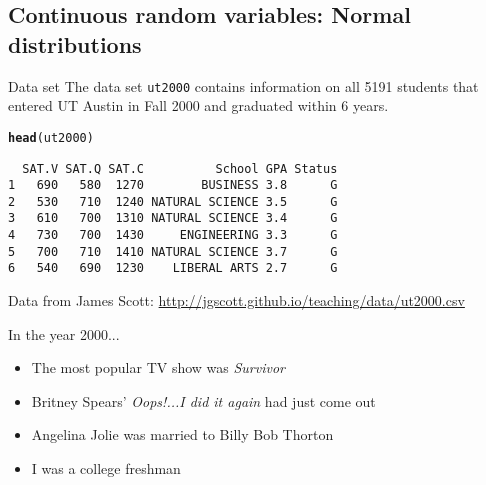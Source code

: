\documentclass{beamer}\usepackage[]{graphicx}\usepackage[]{color}
\makeatletter
\def\maxwidth{ %
  \ifdim\Gin@nat@width>\linewidth
    \linewidth
  \else
    \Gin@nat@width
  \fi
}
\newcommand{\hlstr}[1]{\textcolor[rgb]{0.192,0.494,0.8}{#1}}%
\newcommand{\hlopt}[1]{\textcolor[rgb]{0,0,0}{#1}}%
\newcommand{\hlstd}[1]{\textcolor[rgb]{0.345,0.345,0.345}{#1}}%
\newcommand{\hlkwc}[1]{\textcolor[rgb]{0.333,0.667,0.333}{#1}}%
\newcommand{\hlkwd}[1]{\textcolor[rgb]{0.737,0.353,0.396}{\textbf{#1}}}%
\newenvironment{kframe}{%
 \def\at@end@of@kframe{}%
 \ifinner\ifhmode%
  \def\at@end@of@kframe{\end{minipage}}%
  \begin{minipage}{\columnwidth}%
 \fi\fi%
 \def\FrameCommand##1{\hskip\@totalleftmargin \hskip-\fboxsep
 \colorbox{shadecolor}{##1}\hskip-\fboxsep
     \hskip-\linewidth \hskip-\@totalleftmargin \hskip\columnwidth}%
 \MakeFramed {\advance\hsize-\width
   \@totalleftmargin\z@ \linewidth\hsize
   \@setminipage}}%
 {\par\unskip\endMakeFramed%
 \at@end@of@kframe}
\newenvironment{knitrout}{}{} %
\makeatother
\begin{document}
\begin{darkframes}
\section{Continuous random variables: Normal distributions}

\begin{frame}[fragile]{Data set}
  The data set \texttt{ut2000} contains information on all 5191 students that entered UT Austin in Fall 2000 and graduated within 6 years.
\begin{knitrout}
\color{fgcolor}\begin{kframe}
\begin{alltt}
\hlkwd{head}\hlstd{(ut2000)}
\end{alltt}
\begin{verbatim}
  SAT.V SAT.Q SAT.C          School GPA Status
1   690   580  1270        BUSINESS 3.8      G
2   530   710  1240 NATURAL SCIENCE 3.5      G
3   610   700  1310 NATURAL SCIENCE 3.4      G
4   730   700  1430     ENGINEERING 3.3      G
5   700   710  1410 NATURAL SCIENCE 3.7      G
6   540   690  1230    LIBERAL ARTS 2.7      G
\end{verbatim}
\end{kframe}
\end{knitrout}
  \footnotesize{Data from James Scott: \url{http://jgscott.github.io/teaching/data/ut2000.csv}}
\end{frame}
  
\begin{frame}{In the year 2000...}
  \begin{itemize}[<+->]
    \item The most popular TV show was \emph{Survivor}
    \item Britney Spears' \emph{Oops!...I did it again} had just come out
    \item Angelina Jolie was married to Billy Bob Thorton
    \item I was a college freshman
  \end{itemize}
\end{frame}
  
\end{darkframes}
\end{document}
